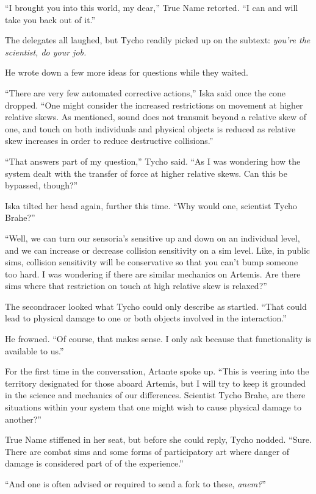 ``I brought you into this world, my dear,'' True Name retorted. ``I can and will take you back out of it.''

The delegates all laughed, but Tycho readily picked up on the subtext: \emph{you're the scientist, do your job.}

He wrote down a few more ideas for questions while they waited.

``There are very few automated corrective actions,'' Iska said once the cone dropped. ``One might consider the increased restrictions on movement at higher relative skews. As mentioned, sound does not transmit beyond a relative skew of one, and touch on both individuals and physical objects is reduced as relative skew increases in order to reduce destructive collisions.''

``That answers part of my question,'' Tycho said. ``As I was wondering how the system dealt with the transfer of force at higher relative skews. Can this be bypassed, though?''

Iska tilted her head again, further this time. ``Why would one, scientist Tycho Brahe?''

``Well, we can turn our sensoria's sensitive up and down on an individual level, and we can increase or decrease collision sensitivity on a sim level. Like, in public sims, collision sensitivity will be conservative so that you can't bump someone too hard. I was wondering if there are similar mechanics on Artemis. Are there sims where that restriction on touch at high relative skew is relaxed?''

The secondracer looked what Tycho could only describe as startled. ``That could lead to physical damage to one or both objects involved in the interaction.''

He frowned. ``Of course, that makes sense. I only ask because that functionality is available to us.''

For the first time in the conversation, Artante spoke up. ``This is veering into the territory designated for those aboard Artemis, but I will try to keep it grounded in the science and mechanics of our differences. Scientist Tycho Brahe, are there situations within your system that one might wish to cause physical damage to another?''

True Name stiffened in her seat, but before she could reply, Tycho nodded. ``Sure. There are combat sims and some forms of participatory art where danger of damage is considered part of of the experience.''

``And one is often advised or required to send a fork to these, \emph{anem?}''

